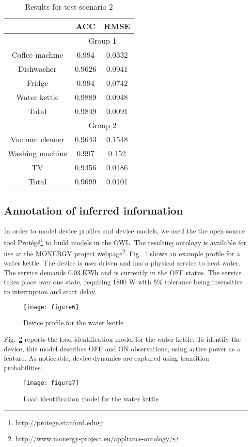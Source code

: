 \documentclass{article}
\begin{document}
{\begin{table}
 \centering
 \begin{tabular}{|c|cc|}
\hline

&  \ac{ACC} & \ac{RMSE}  \\
\hline
\hline
& \multicolumn{2}{c|}{Group 1} \\
\hline
Coffee machine 			& 0.994		& 0.0332   \\
Dishwasher 				& 0.9626	& 0.0941  \\
Fridge 					& 0.994 	& 0,0742 \\
Water kettle			& 0.9889	& 0.0948 \\
\hline
Total 					& 0.9849	& 0.0091  \\
\hline
\hline
& \multicolumn{2}{c|}{Group 2} \\
\hline
Vacuum cleaner			& 0.9643	& 0.1548  \\
Washing machine  		& 0.997		& 0.152	\\
TV 						& 0.9456	& 0.0186  \\
\hline
\hline
Total 					& 0.9699 & 0.0101  \\
\hline
\end{tabular}
\caption{Results for test scenario 2}
\label{tab:groupedResults}
\end{table}

\subsection{Annotation of inferred information}
In order to model device profiles and device models, we used the the open source tool Prot\'eg\'e\footnote{http://protege.stanford.edu} to build models in the \ac{OWL}.
The resulting ontology is available for use at the MONERGY project webpage\footnote{http://www.monergy-project.eu/appliance-ontology/}.
Fig.~\ref{fig:datasheetkettle} shows an example profile for a water kettle.
The device is user driven and has a physical service to heat water.
The service demands 0.03 KWh and is currently in the OFF status.
The service takes place over one state, requiring 1800 W with 5\% tolerance being insensitive to interruption and start delay.
\begin{figure}[h!]
\centering
\texttt{[image: figure6]}
\caption{Device profile for the water kettle}
\label{fig:datasheetkettle}
\end{figure}
Fig.~\ref{fig:nilmmodelkettle} reports the load identification model for the water kettle.
To identify the device, this model describes OFF and ON observations, using active power as a feature.
As noticeable, device dynamics are captured using transition probabilities.
\begin{figure}[h!]
\centering
\texttt{[image: figure7]}
\caption{Load identification model for the water kettle}
\label{fig:nilmmodelkettle}
\end{figure}

}
\end{document}
